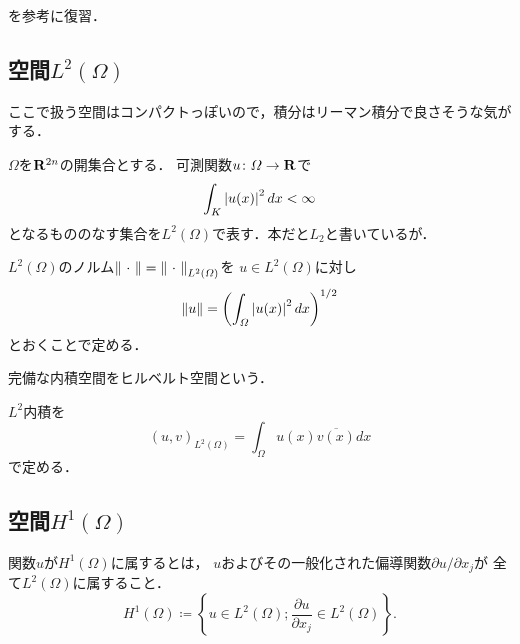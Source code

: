 \cite{藤黒伊91}を参考に復習．

\subsection*{空間\(L^2(\varOmega)\)}
ここで扱う空間はコンパクトっぽいので，積分はリーマン積分で良さそうな気がする．

\(\varOmega\)を\(\rr^{2n}\)の開集合とする．
可測関数\(u\colon \varOmega\to \rr\)で
\[
    \int_{K}^{}\abs[u(x)]^{2} dx<\infty
\]
となるもののなす集合を\(L^2(\varOmega)\)で表す．本だと\(L_2\)と書いているが．

\(L^2(\varOmega)\)のノルム\(\norm[\blk]=\norm[\blk]_{L^2(\varOmega)}\)を
\(u\in L^2(\varOmega)\)に対し
\[
    \norm[u]=\left(\int_{\varOmega}^{}\abs[u(x)]^{2}dx\right)^{1/2}
\]
とおくことで定める．

\begin{DFN*}
    完備な内積空間をヒルベルト空間という．
\end{DFN*}

\(L^2\)内積を
\[
    (u,v)_{L^2(\varOmega)}=\int_{\varOmega}^{}u(x)\overline{v(x)}dx
\]で定める．

\subsection*{空間\(H^1(\varOmega)\)}

\begin{DFN*}
    関数\(u\)が\(H^1(\varOmega)\)に属するとは，
    \(u\)およびその一般化された偏導関数\(\partial u/\partial x_j\)が
    全て\(L^2(\varOmega)\)に属すること．
    \[
        H^1(\varOmega)
        \coloneqq
        \left\{
            u\in L^2(\varOmega);
            \frac{\partial u}{\partial x_j}\in L^2(\Omega)
        \right\}.
    \]
\end{DFN*}

